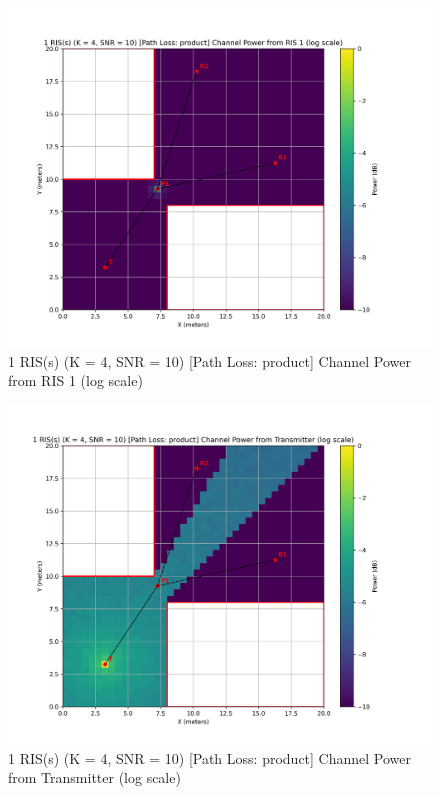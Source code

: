 \begin{figure}[H]
  \centering
  \includegraphics[width=0.8\linewidth]{imgs/heatmap-simulations/1 RIS(s) (K = 4, SNR = 10) [Path Loss_ product] Channel Power from RIS 1 (log scale).png}
  \caption{1 RIS(s) (K = 4, SNR = 10) [Path Loss: product] Channel Power from RIS 1 (log scale)}
\end{figure}

\begin{figure}[H]
  \centering
  \includegraphics[width=0.8\linewidth]{imgs/heatmap-simulations/1 RIS(s) (K = 4, SNR = 10) [Path Loss_ product] Channel Power from Transmitter (log scale).png}
  \caption{1 RIS(s) (K = 4, SNR = 10) [Path Loss: product] Channel Power from Transmitter (log scale)}
\end{figure}


